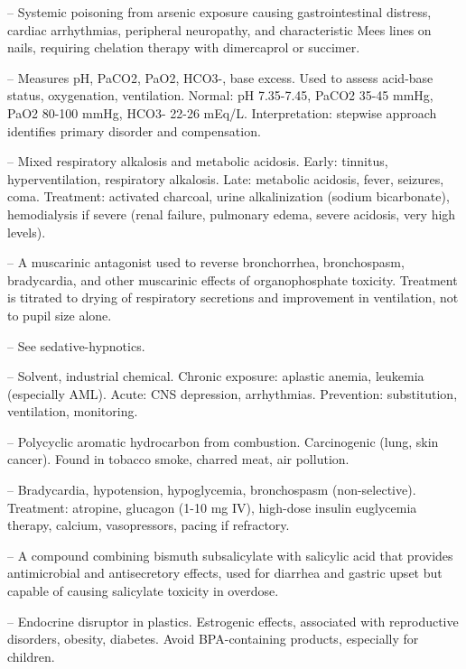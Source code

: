 -- Systemic poisoning from arsenic exposure causing gastrointestinal distress, cardiac arrhythmias, peripheral neuropathy, and characteristic Mees lines on nails, requiring chelation therapy with dimercaprol or succimer.

-- Measures pH, PaCO2, PaO2, HCO3-, base excess. Used to assess acid-base status, oxygenation, ventilation. Normal: pH 7.35-7.45, PaCO2 35-45 mmHg, PaO2 80-100 mmHg, HCO3- 22-26 mEq/L. Interpretation: stepwise approach identifies primary disorder and compensation.

-- Mixed respiratory alkalosis and metabolic acidosis. Early: tinnitus, hyperventilation, respiratory alkalosis. Late: metabolic acidosis, fever, seizures, coma. Treatment: activated charcoal, urine alkalinization (sodium bicarbonate), hemodialysis if severe (renal failure, pulmonary edema, severe acidosis, very high levels).

-- A muscarinic antagonist used to reverse bronchorrhea, bronchospasm, bradycardia, and other muscarinic effects of organophosphate toxicity. Treatment is titrated to drying of respiratory secretions and improvement in ventilation, not to pupil size alone.

-- See sedative-hypnotics.

-- Solvent, industrial chemical. Chronic exposure: aplastic anemia, leukemia (especially AML). Acute: CNS depression, arrhythmias. Prevention: substitution, ventilation, monitoring.

-- Polycyclic aromatic hydrocarbon from combustion. Carcinogenic (lung, skin cancer). Found in tobacco smoke, charred meat, air pollution.

-- Bradycardia, hypotension, hypoglycemia, bronchospasm (non-selective). Treatment: atropine, glucagon (1-10 mg IV), high-dose insulin euglycemia therapy, calcium, vasopressors, pacing if refractory.

-- A compound combining bismuth subsalicylate with salicylic acid that provides antimicrobial and antisecretory effects, used for diarrhea and gastric upset but capable of causing salicylate toxicity in overdose.

-- Endocrine disruptor in plastics. Estrogenic effects, associated with reproductive disorders, obesity, diabetes. Avoid BPA-containing products, especially for children.

